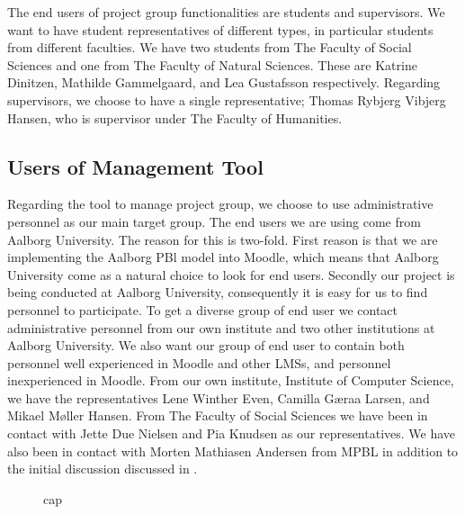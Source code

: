 The end users of project group functionalities are students and supervisors.
We want to have student representatives of different types, in particular students from different faculties.
We have two students from The Faculty of Social Sciences and one from The Faculty of Natural Sciences.
These are Katrine Dinitzen, Mathilde Gammelgaard, and Lea Gustafsson respectively.
Regarding supervisors, we choose to have a single representative; Thomas Rybjerg Vibjerg Hansen, who is supervisor under The Faculty of Humanities.

\subsection{Users of Management Tool}
Regarding the tool to manage project group, we choose to use administrative personnel as our main target group.
The end users we are using come from Aalborg University.
The reason for this is two-fold.
First reason is that we are implementing the Aalborg PBl model into Moodle, which means that Aalborg University come as a natural choice to look for end users.
Secondly our project is being conducted at Aalborg University, consequently it is easy for us to find personnel to participate.
To get a diverse group of end user we contact administrative personnel from our own institute and two other institutions at Aalborg University.
We also want our group of end user to contain both personnel well experienced in Moodle and other LMSs, and personnel inexperienced in Moodle.
From our own institute, Institute of Computer Science, we have the representatives Lene Winther Even, Camilla G\ae{}raa Larsen, and Mikael M\o{}ller Hansen.
From The Faculty of Social Sciences we have been in contact with  Jette Due Nielsen and Pia Knudsen as our representatives.
We have also been in contact with Morten Mathiasen Andersen from MPBL in addition to the initial discussion discussed in .


\begin{figure}
	\centering
		\begin{tabular}[|c|c|]
			
		\end{tabular}
	\caption{cap}
	\label{tab:cap}
\end{figure}
